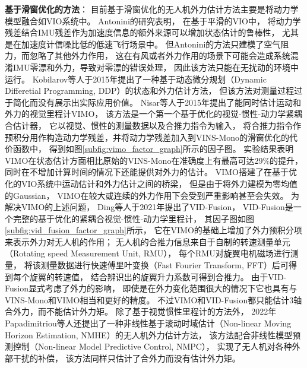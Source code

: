 \textbf{基于滑窗优化的方法}：
目前基于滑窗优化的无人机外力估计方法主要是将动力学模型融合如VIO系统中。
Antonini的研究\cite{antonini2018pre}表明，
在基于平滑的VIO中，
将动力学残差结合IMU残差作为加速度信息的额外来源可以增加状态估计的鲁棒性，
尤其是在加速度计信噪比低的低速飞行场景中。
但Antonini的方法只建模了空气阻力，而忽略了其他外力作用，
这在有风或者外力作用的场景下可能会造成系统混淆IMU零漂和外力，导致对零漂的错误处理\cite{abeywardena2014model}，
因此该方法只能在无扰动的环境中运行。
Kobilarov等人于2015年提出了一种基于动态微分规划（Dynamic Differetial Programming, DDP）的状态和外力估计方法\cite{kobilarov2015differential}，
但该方法对测量过程过于简化而没有展示出实际应用价值。
Nisar等人于2015年提出了能同时估计运动和外力的视觉里程计VIMO\cite{nisar2019vimo}，
该方法是一个第一个基于优化的视觉-惯性-动力学紧耦合估计器，
它以视觉、惯性的测量数据以及合推力指令为输入，
将合推力指令作预积分用作构造动力学残差，并将动力学残差加入到VINS-Mono\cite{qin2018vins}的滑窗优化的代价函数中，
得到如图\ref{subfig:vimo_factor_graph}所示的因子图。
实验结果表明VIMO在状态估计方面相比原始的VINS-Mono在准确度上有最高可达29\%的提升，
同时在不增加计算时间的情况下还能提供对外力的估计。
VIMO搭建了在基于优化的VIO系统中运动估计和外力估计之间的桥梁，
但是由于将外力建模为零均值的Gaussian，
VIMO在较大或连续的外力作用下会受到严重影响甚至会失效\cite{ding2021vid}。
为解决VIMO的上述问题，
Ding等人于2021年提出了VID-Fusion\cite{ding2021vid}，
VID-Fusion是一个完整的基于优化的紧耦合视觉-惯性-动力学里程计，
其因子图如图\ref{subfig:vid_fusion_factor_graph}所示，
它在VIMO的基础上增加了外力预积分项来表示外力对无人机的作用；
无人机的合推力信息来自于自制的转速测量单元（Rotating speed Measurement Unit, RMU），
每个RMU对旋翼电机磁场进行测量，
将该测量数据进行快速傅里叶变换（Fast Fourier Transform, FFT）后可得到每个旋翼的转速值，
结合辨识出的旋翼升力系数可得到合推力。
由于VID-Fusion显式考虑了外力的影响，
即使是在外力变化范围很大的情况下它也具有与VINS-Mono和VIMO相当和更好的精度。
不过VIMO和VID-Fusion都只能估计3轴合外力，而不能估计外力矩。
除了基于视觉惯性里程计的方法外，
2022年Papadimitriou等人还提出了一种非线性基于滚动时域估计（Non-linear Moving Horizon Estimation, NMHE）的无人机外力估计方法\cite{papadimitriou2022external}，
该方法配合非线性模型预测控制（Non-linear Model Predictive Control, NMPC），
实现了无人机对各种外部干扰的补偿，
该方法同样只估计了合外力而没有估计外力矩。

